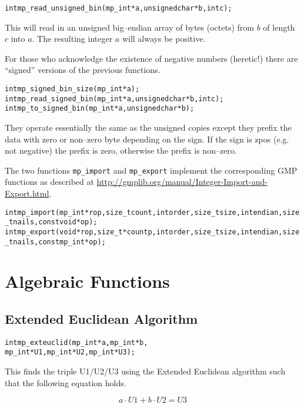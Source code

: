 \documentclass[synpaper]{book}
\begin{document}
\begin{alltt}
int mp_read_unsigned_bin(mp_int *a, unsigned char *b, int c);
\end{alltt}
This will read in an unsigned big--endian array of bytes (octets) from $b$ of length $c$ into $a$.  The resulting
integer $a$ will always be positive.

For those who acknowledge the existence of negative numbers (heretic!) there are ``signed'' versions of the
previous functions.
  
\begin{alltt}
int mp_signed_bin_size(mp_int *a);
int mp_read_signed_bin(mp_int *a, unsigned char *b, int c);
int mp_to_signed_bin(mp_int *a, unsigned char *b);
\end{alltt}
They operate essentially the same as the unsigned copies except they prefix the data with zero or non--zero
byte depending on the sign.  If the sign is zpos (e.g. not negative) the prefix is zero, otherwise the prefix
is non--zero.

The two functions \texttt{mp\_import} and \texttt{mp\_export} implement the corresponding GMP functions as described at \url{http://gmplib.org/manual/Integer-Import-and-Export.html}.
 
\begin{alltt}
int mp_import(mp_int *rop, size_t count, int order, size_t size, int endian, size_t nails, const void *op);
int mp_export(void *rop, size_t *countp, int order, size_t size, int endian, size_t nails, const mp_int *op);
\end{alltt}

\chapter{Algebraic Functions}
\section{Extended Euclidean Algorithm}
\begin{alltt}
int mp_exteuclid(mp_int *a, mp_int *b,
                 mp_int *U1, mp_int *U2, mp_int *U3);
\end{alltt}

This finds the triple U1/U2/U3 using the Extended Euclidean algorithm such that the following equation holds.

\begin{equation}
a \cdot U1 + b \cdot U2 = U3
\end{equation}
\end{document}
